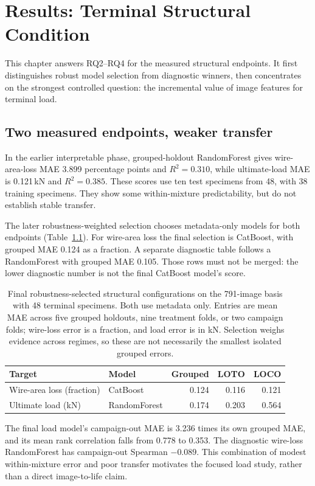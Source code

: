 \chapter{Results: Terminal Structural Condition}\label{ch:structural}
This chapter answers RQ2--RQ4 for the measured structural endpoints. It first distinguishes robust model selection from diagnostic winners, then concentrates on the strongest controlled question: the incremental value of image features for terminal load.

\section{Two measured endpoints, weaker transfer}
In the earlier interpretable phase, grouped-holdout RandomForest gives wire-area-loss MAE 3.899 percentage points and $R^2=0.310$, while ultimate-load MAE is 0.121\,kN and $R^2=0.385$. These scores use ten test specimens from 48, with 38 training specimens. They show some within-mixture predictability, but do not establish stable transfer.

The later robustness-weighted selection chooses metadata-only models for both endpoints (Table~\ref{tab:robustselection}). For wire-area loss the final selection is CatBoost, with grouped MAE 0.124 as a fraction. A separate diagnostic table follows a RandomForest with grouped MAE 0.105. Those rows must not be merged: the lower diagnostic number is not the final CatBoost model's score.
\begin{table}[htbp]\centering\small
\caption{Final robustness-selected structural configurations on the 791-image basis with 48 terminal specimens. Both use metadata only. Entries are mean MAE across five grouped holdouts, nine treatment folds, or two campaign folds; wire-loss error is a fraction, and load error is in kN. Selection weighs evidence across regimes, so these are not necessarily the smallest isolated grouped errors.}\label{tab:robustselection}
\begin{tabular}{llrrr}\toprule
Target & Model & Grouped & LOTO & LOCO\\\midrule
Wire-area loss (fraction) & CatBoost & 0.124 & 0.116 & 0.121\\
Ultimate load (kN) & RandomForest & 0.174 & 0.203 & 0.564\\\bottomrule
\end{tabular}
\end{table}
The final load model's campaign-out MAE is 3.236 times its own grouped MAE, and its mean rank correlation falls from 0.778 to 0.353. The diagnostic wire-loss RandomForest has campaign-out Spearman $-0.089$. This combination of modest within-mixture error and poor transfer motivates the focused load study, rather than a direct image-to-life claim.

